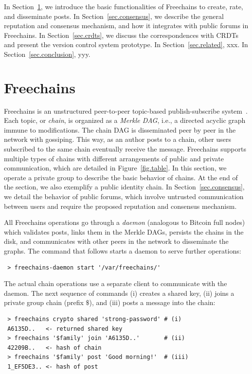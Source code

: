 \documentclass[10pt,journal,compsoc]{IEEEtran}
\newcommand{\FC}       {Freechains\xspace}
\begin{document}
In Section~\ref{sec.freechains}, we introduce the basic functionalities of \FC
to create, rate, and disseminate posts.
In Section~\ref{sec.consensus}, we describe the general reputation and
consensus mechanism, and how it integrates with public forums in \FC.
In Section~\ref{sec.crdts}, we discuss the correspondences with CRDTs and
present the version control system prototype.
In Section~\ref{sec.related}, xxx.
In Section~\ref{sec.conclusion}, yyy.

\section{Freechains}
\label{sec.freechains}

\FC is an unstructured peer-to-peer topic-based publish-subscribe
system~\cite{fcs.sbseg20}.
Each topic, or \emph{chain}, is organized as a \emph{Merkle DAG}, i.e., a
directed acyclic graph immune to modifications.
The chain DAG is disseminated peer by peer in the network with gossiping.
This way, as an author posts to a chain, other users subscribed to the same
chain eventually receive the message.
\FC supports multiple types of chains with different arrangements of public and
private communication, which are detailed in Figure~\ref{fig.table}.
In this section, we operate a private group to describe the basic behavior of
chains.
At the end of the section, we also exemplify a public identity chain.
In Section~\ref{sec.consensus}, we detail the behavior of public forums, which
involve untrusted communication between users and require the proposed
reputation and consensus mechanism.

All \FC operations go through a \emph{daemon} (analogous to Bitcoin full nodes)
which validates posts, links them in the Merkle DAGs, persists the chains in
the disk, and communicates with other peers in the network to disseminate the
graphs.
The command that follows starts a daemon to serve further operations:

{\footnotesize
\begin{verbatim}
 > freechains-daemon start '/var/freechains/'
\end{verbatim}
}

The actual chain operations use a separate client to communicate with the
daemon.
The next sequence of commands (i) creates a shared key, (ii) joins a private
group chain (prefix $\$$), and (iii) posts a message into the chain:

{\footnotesize
\begin{verbatim}
 > freechains crypto shared 'strong-password' # (i)
 A6135D..   <- returned shared key
 > freechains '$family' join 'A6135D..'       # (ii)
 42209B..   <- hash of chain
 > freechains '$family' post 'Good morning!'  # (iii)
 1_EF5DE3.. <- hash of post
\end{verbatim}
}
\end{document}
